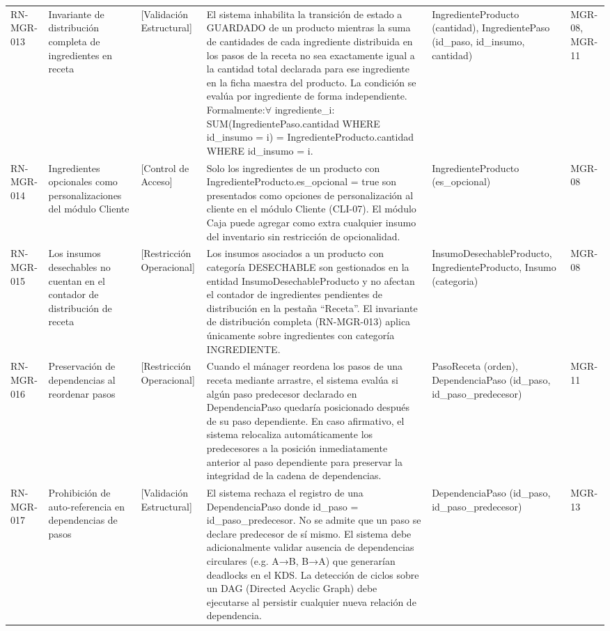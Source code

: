 \begin{landscape}
\begin{longtable}[c]{l p{2.1cm} p{2.1cm} p{8cm} p{4cm} p{3cm}}
RN-MGR-013 & Invariante de distribución completa de ingredientes en receta & [Validación Estructural] & El sistema inhabilita la transición de estado a GUARDADO de un producto mientras la suma de cantidades de cada ingrediente distribuida en los pasos de la receta no sea exactamente igual a la cantidad total declarada para ese ingrediente en la ficha maestra del producto. La condición se evalúa por ingrediente de forma independiente. Formalmente:$\forall$ ingrediente\_i: SUM(IngredientePaso.cantidad WHERE id\_insumo = i) = IngredienteProducto.cantidad WHERE id\_insumo = i. & IngredienteProducto (cantidad), IngredientePaso (id\_paso, id\_insumo, cantidad) & MGR-08, MGR-11 \\
\addlinespace
RN-MGR-014 & Ingredientes opcionales como personalizaciones del módulo Cliente & [Control de Acceso] & Solo los ingredientes de un producto con IngredienteProducto.es\_opcional = true son presentados como opciones de personalización al cliente en el módulo Cliente (CLI-07). El módulo Caja puede agregar como extra cualquier insumo del inventario sin restricción de opcionalidad. & IngredienteProducto (es\_opcional) & MGR-08 \\
\addlinespace
RN-MGR-015 & Los insumos desechables no cuentan en el contador de distribución de receta & [Restricción Operacional] & Los insumos asociados a un producto con categoría DESECHABLE son gestionados en la entidad InsumoDesechableProducto y no afectan el contador de ingredientes pendientes de distribución en la pestaña ``Receta''. El invariante de distribución completa (RN-MGR-013) aplica únicamente sobre ingredientes con categoría INGREDIENTE. & InsumoDesechableProducto, IngredienteProducto, Insumo (categoria) & MGR-08 \\
\addlinespace
RN-MGR-016 & Preservación de dependencias al reordenar pasos & [Restricción Operacional] & Cuando el mánager reordena los pasos de una receta mediante arrastre, el sistema evalúa si algún paso predecesor declarado en DependenciaPaso quedaría posicionado después de su paso dependiente. En caso afirmativo, el sistema relocaliza automáticamente los predecesores a la posición inmediatamente anterior al paso dependiente para preservar la integridad de la cadena de dependencias. & PasoReceta (orden), DependenciaPaso (id\_paso, id\_paso\_predecesor) & MGR-11 \\
\addlinespace
RN-MGR-017 & Prohibición de auto-referencia en dependencias de pasos & [Validación Estructural] & El sistema rechaza el registro de una DependenciaPaso donde id\_paso = id\_paso\_predecesor. No se admite que un paso se declare predecesor de sí mismo. El sistema debe adicionalmente validar ausencia de dependencias circulares (e.g. A→B, B→A) que generarían deadlocks en el KDS. La detección de ciclos sobre un DAG (Directed Acyclic Graph) debe ejecutarse al persistir cualquier nueva relación de dependencia. & DependenciaPaso (id\_paso, id\_paso\_predecesor) & MGR-13 \\

\end{longtable}
\end{landscape}

